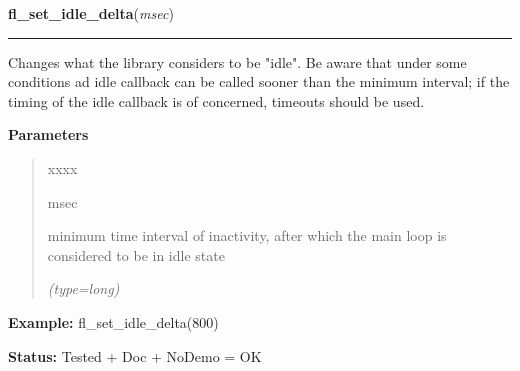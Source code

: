     \vspace{0.5ex}

\hspace{.8\funcindent}\begin{boxedminipage}{\funcwidth}

    \raggedright \textbf{fl\_set\_idle\_delta}(\textit{msec})

    \vspace{-1.5ex}

    \rule{\textwidth}{0.5\fboxrule}
\setlength{\parskip}{2ex}
    Changes what the library considers to be "idle". Be aware that under 
    some conditions ad idle callback can be called sooner than the minimum 
    interval; if the timing of the idle callback is of concerned, timeouts 
    should be used.

\setlength{\parskip}{1ex}
      \textbf{Parameters}
      \vspace{-1ex}

      \begin{quote}
        \begin{Ventry}{xxxx}

          \item[msec]

          minimum time interval of inactivity, after which the main loop is
          considered to be in idle state

            {\it (type=long)}

        \end{Ventry}

      \end{quote}

\textbf{Example:} fl\_set\_idle\_delta(800)



\textbf{Status:} Tested + Doc + NoDemo = OK



    \end{boxedminipage}

    \label{xformslib:flxbasic:fl_add_event_callback}

    \vspace{0.5ex}

